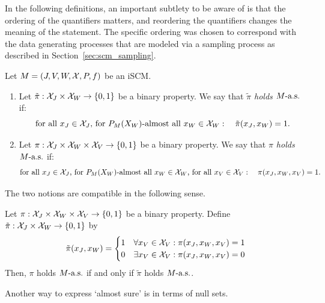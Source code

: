 In the following definitions, an important subtlety to be aware of is that the ordering of the quantifiers matters, and reordering the quantifiers changes the meaning of the statement. 
The specific ordering was chosen to correspond with the data generating processes that are modeled via a sampling process as described in Section~\ref{sec:scm_sampling}.
\begin{Def}
  Let $M = \left ( J, V, W, \mathcal{X}, P, f \right )$ be an iSCM.
  \begin{enumerate}
    \item Let $\tilde\pi : \mathcal{X}_J \times \mathcal{X}_W \to \{0,1\}$ be a binary property.
      We say that \emph{$\tilde\pi$ holds $M\text{-a.s.}$} if:
      $$\text{for all $x_J \in \mathcal{X}_J$, for $P_M(X_W)$-almost all $x_W \in \mathcal{X}_W$}: \quad \tilde\pi(x_J,x_W) = 1.$$
    \item Let $\pi : \mathcal{X}_J \times \mathcal{X}_W \times \mathcal{X}_V \to \{0,1\}$ be a binary property.
       We say that \emph{$\pi$ holds $M\text{-a.s.}$} if:
      $$\text{for all $x_J \in \mathcal{X}_J$, for $P_M(X_W)$-almost all $x_W \in \mathcal{X}_W$, for all $x_V \in \mathcal{X}_V$}: \quad \pi(x_J,x_W,x_V) = 1.$$
  \end{enumerate}
\end{Def}
The two notions are compatible in the following sense.
\begin{Rem}
  Let $\pi : \mathcal{X}_J \times \mathcal{X}_W \times \mathcal{X}_V \to \{0,1\}$ be a binary property.
  Define $\tilde\pi : \mathcal{X}_J \times \mathcal{X}_W \to \{0,1\}$ by
   $$\tilde \pi(x_J,x_W) = \begin{cases}
     1 & \forall x_V \in \mathcal{X}_V: \pi(x_J,x_W,x_V) = 1 \\
     0 & \exists x_V \in \mathcal{X}_V: \pi(x_J,x_W,x_V) = 0
   \end{cases}$$
  Then, $\pi$ holds $M\text{-a.s.}$ if and only if $\tilde\pi$ holds $M\text{-a.s.}$.
\end{Rem}
Another way to express `almost sure' is in terms of null sets.
